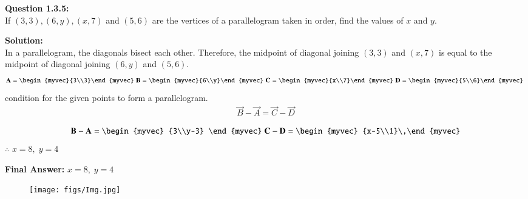 \documentclass[journal]{IEEEtran}
\begin{document}

\textbf{Question 1.3.5:} \\
If $(3,3), (6,y), (x,7)$ and $(5,6)$ are the vertices of a parallelogram taken in order, 
find the values of $x$ and $y$.

\bigskip
\textbf{Solution:} \\
In a parallelogram, the diagonals bisect each other. Therefore, the midpoint of diagonal 
joining $(3,3)$ and $(x,7)$ is equal to the midpoint of diagonal joining $(6,y)$ and $(5,6)$.
\begin{align}
    \vec{A}=\begin{myvec}{3\\3}\end{myvec}\;
    \vec{B}=\begin{myvec}{6\\y}\end{myvec}\;
    \vec{C}=\begin{myvec}{x\\7}\end{myvec}\;         \vec{D}=\begin{myvec}{5\\6}\end{myvec}\
\end{align}
condition for the given points to form a parallelogram.\\
\begin{align}
    \vec{B}-\vec{A}=\vec{C}-\vec{D}
\end{align}


\begin{align}
    \vec{B}-\vec{A}=\begin{myvec}
        {3\\y-3}
    \end{myvec} \;
    \vec{C}-\vec{D}=\begin{myvec}
        {x-5\\1}\
    \end{myvec}
\end{align}
$\therefore$ $x=8, \; y=4$  


\bigskip
\textbf{Final Answer:} \quad $x=8, \; y=4$

\begin{figure}
    \centering
    \texttt{[image: figs/Img.jpg]}
    \caption{}
    \label{fig:placeholder}
\end{figure}
\end{document}
